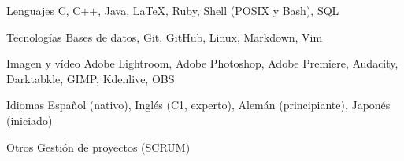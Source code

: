 
\begin{cvskills}

\cvskill%
	{Lenguajes} %
	{C, C++, Java, LaTeX, Ruby, Shell (POSIX y Bash), SQL} %

\cvskill%
	{Tecnologías}
	{Bases de datos, Git, GitHub, Linux, Markdown, Vim}

\cvskill%
	{Imagen y vídeo}
	{Adobe Lightroom, Adobe Photoshop, Adobe Premiere, Audacity, Darktabkle, GIMP, Kdenlive, OBS}

\cvskill%
	{Idiomas}
	{Español (nativo), Inglés (C1, experto), Alemán (principiante), Japonés (iniciado)}

\cvskill%
	{Otros}
	{Gestión de proyectos (SCRUM)}

\end{cvskills}
